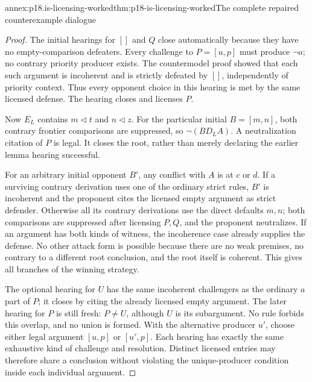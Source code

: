 \begin{annexitem}{annex:p18.is-licensing-worked}{thm:p18-is-licensing-worked}{The complete repaired counterexample dialogue}
\begin{proof}
The initial hearings for \([]\) and \(Q\) close automatically
because they have no empty-comparison defeaters.
Every challenge to \(P=[u,p]\) must produce \(\neg a\);
no contrary priority producer exists.
The countermodel proof showed that each such argument is
incoherent and is strictly defeated by \([]\), independently
of priority context. Thus every opponent choice in this hearing
is met by the same licensed defense. The hearing closes and
licenses \(P\).

Now \(E_L\) contains \(m\triangleleft t\) and
\(n\triangleleft z\). For the particular initial
\(B=[m,n]\), both contrary frontier comparisons are suppressed,
so \(\neg(BD_LA)\). A neutralization citation of \(P\) is legal.
It closes the root, rather than merely declaring the earlier
lemma hearing successful.

For an arbitrary initial opponent \(B'\), any conflict with
\(A\) is at \(c\) or \(d\).
If a surviving contrary derivation uses one of the ordinary
strict rules, \(B'\) is incoherent and the proponent cites
the licensed empty argument as strict defender.
Otherwise all its contrary derivations use the direct
defaults \(m,n\); both comparisons are suppressed after
licensing \(P,Q\), and the proponent neutralizes.
If an argument has both kinds of witness, the incoherence
case already supplies the defense.
No other attack form is possible because there are no weak
premises, no contrary to a different root conclusion, and
the root itself is coherent. This gives all branches of
the winning strategy.

The optional hearing for \(U\) has the same incoherent
challengers as the ordinary \(a\) part of \(P\); it closes
by citing the already licensed empty argument.
The later hearing for \(P\) is still fresh: \(P\ne U\),
although \(U\) is its subargument.
No rule forbids this overlap, and no union is formed.
With the alternative producer \(u'\), choose either legal
argument \([u,p]\) or \([u',p]\). Each hearing has exactly
the same exhaustive kind of challenge and resolution.
Distinct licensed entries may therefore share a conclusion
without violating the unique-producer condition inside each
individual argument.


\end{proof}
\end{annexitem}
